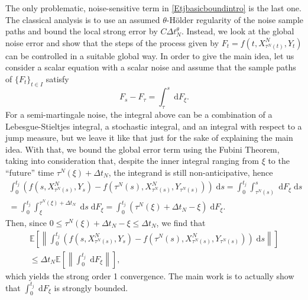 \documentclass[reqno,12pt]{amsart}
\theoremstyle{plain} %
\theoremstyle{definition} %
\begin{document}
The only problematic, noise-sensitive term in \cref{Etjbasicboundintro} is the last one. The classical analysis is to use an assumed $\theta$-H\"older regularity of the noise sample paths and bound the local strong error by $C\Delta t_N^{\theta}.$ Instead, we look at the global noise error and show that the steps of the process given by $F_t = f(t, X_{\tau^N(t)}^N, Y_t)$ can be controlled in a suitable global way. In order to give the main idea, let us consider a scalar equation with a scalar noise and assume that the sample paths of $\{F_t\}_{t\in I}$ satisfy
\[
    F_s - F_\tau = \int_\tau^s \;\mathrm{d}F_\xi.
\]
For a semi-martingale noise, the integral above can be a combination of a Lebesgue-Stieltjes integral, a stochastic integral, and an integral with respect to a jump measure, but we leave it like that just for the sake of explaining the main idea. With that, we bound the global error term using the Fubini Theorem, taking into consideration that, despite the inner integral ranging from $\xi$ to the ``future'' time $\tau^N(\xi) + \Delta t_N$, the integrand is still non-anticipative, hence
\begin{multline*}
    \int_0^{t_j} \left( f(s, X_{\tau^N(s)}^N, Y_s) - f(\tau^N(s), X_{\tau^N(s)}^N, Y_{\tau^N(s)}) \right)\;\mathrm{d}s = \int_0^{t_j} \int_{\tau^N(s)}^s \;\mathrm{d}  F_\xi\;\mathrm{d}s \\
    = \int_0^{t_j} \int_{\xi}^{\tau^N(\xi) + \Delta t_N} \;\mathrm{d}s \;\mathrm{d} F_\xi  = \int_0^{t_j} (\tau^N(\xi) + \Delta t_N - \xi) \;\mathrm{d} F_\xi.
\end{multline*}
Then, since $0 \leq \tau^N(\xi) + \Delta t_N - \xi \leq \Delta t_N$, we find that
\begin{multline*}
    \mathbb{E}\left[\left\| \int_0^{t_j} \left( f(s, X_{\tau^N(s)}^N, Y_s) - f(\tau^N(s), X_{\tau^N(s)}^N, Y_{\tau^N(s)}) \right)\;\mathrm{d}s\right\|\right] \\
    \leq \Delta t_N\mathbb{E}\left[\left\| \int_0^{t_j} \;\mathrm{d} F_\xi \right\|\right],
\end{multline*}
which yields the strong order 1 convergence. The main work is to actually show that $\int_0^{t_j} \;\mathrm{d} F_\xi$ is strongly bounded.
\end{document}
